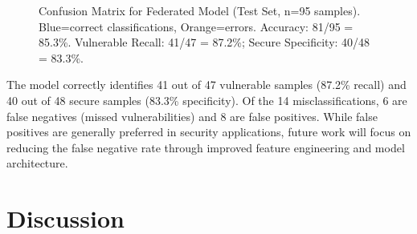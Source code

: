 \documentclass[conference]{IEEEtran}
\begin{document}
\begin{figure}[h]
\centering
{}
\caption{Confusion Matrix for Federated Model (Test Set, n=95 samples). Blue=correct classifications, Orange=errors. Accuracy: 81/95 = 85.3\%. Vulnerable Recall: 41/47 = 87.2\%; Secure Specificity: 40/48 = 83.3\%.}
\label{fig:confusion}
\end{figure}

The model correctly identifies 41 out of 47 vulnerable samples (87.2\% recall) and 40 out of 48 secure samples (83.3\% specificity). Of the 14 misclassifications, 6 are false negatives (missed vulnerabilities) and 8 are false positives. While false positives are generally preferred in security applications, future work will focus on reducing the false negative rate through improved feature engineering and model architecture.

\section{Discussion}
\end{document}
